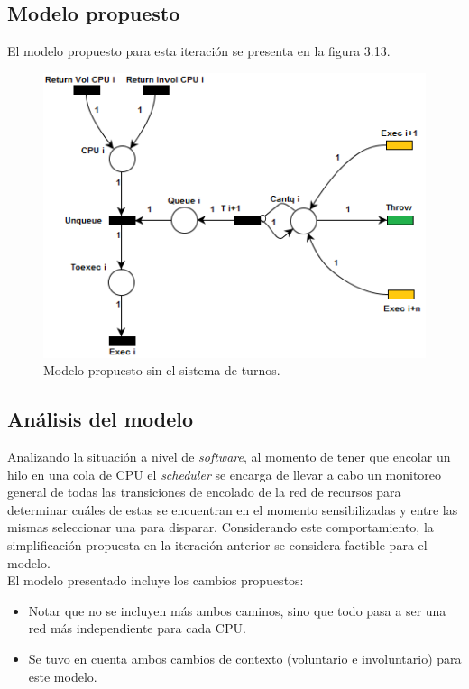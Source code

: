 \documentclass[a4paper]{book}
\begin{document}
\subsection{Modelo propuesto}
El modelo propuesto para esta iteraci\'on se presenta en la figura 3.13.

\begin{figure} [H]
	\begin{center}
	    \includegraphics[scale=1]{./imagenes/it7modelored.png}
		\caption{Modelo propuesto sin el sistema de turnos.}
	\end{center}
\end{figure}

\subsection{An\'alisis del modelo}
Analizando la situaci\'on a nivel de \emph{software}, al momento de tener que encolar un hilo en una cola de CPU el \emph{scheduler} se encarga de llevar a cabo un monitoreo general de todas las transiciones de encolado de la red de recursos para determinar cu\'ales de estas se encuentran en el momento sensibilizadas y entre las mismas seleccionar una para disparar. Considerando este comportamiento, la simplificaci\'on propuesta en la iteraci\'on anterior se considera factible para el modelo.\\

El modelo presentado incluye los cambios propuestos:
\begin{itemize}
\item Notar que no se incluyen m\'as ambos caminos, sino que todo pasa a ser una red m\'as independiente para cada CPU.
\item Se tuvo en cuenta ambos cambios de contexto (voluntario e involuntario) para este modelo.
\end{itemize}
\end{document}

